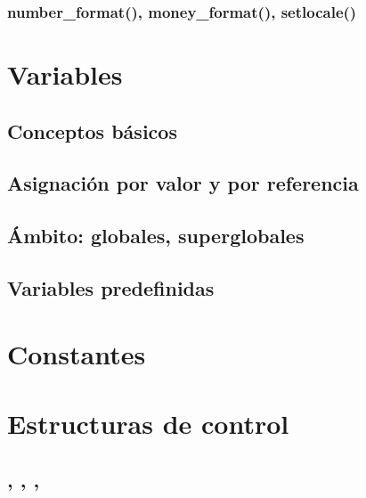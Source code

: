 \documentclass[a4paper,11pt,spanish]{sphinxmanual}
\begin{document}
\subsubsection{number\_format(), money\_format(), setlocale()}
\label{\detokenize{php:number-format-money-format-setlocale}}

\section{Variables}
\label{\detokenize{php:variables}}

\subsection{Conceptos básicos}
\label{\detokenize{php:conceptos-basicos}}

\subsection{Asignación por valor y por referencia}
\label{\detokenize{php:asignacion-por-valor-y-por-referencia}}

\subsection{Ámbito: globales, superglobales}
\label{\detokenize{php:ambito-globales-superglobales}}

\subsection{Variables predefinidas}
\label{\detokenize{php:variables-predefinidas}}

\section{Constantes}
\label{\detokenize{php:constantes}}

\section{Estructuras de control}
\label{\detokenize{php:estructuras-de-control}}

\subsection{, , , }
\label{\detokenize{php:require-require-once-include-include-once}}
\end{document}
